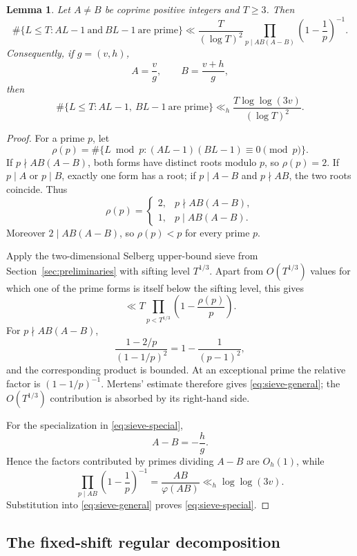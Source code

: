 \documentclass[11pt,reqno]{amsart}
\numberwithin{equation}{section}
\theoremstyle{plain}
\newtheorem{lemma}[theorem]{Lemma}
\theoremstyle{definition}
\theoremstyle{remark}
\begin{document}
\begin{lemma}\label{lem:two-linear-sieve}
Let $A\ne B$ be coprime positive integers and $T\ge3$. Then
\begin{equation}\label{eq:sieve-general}
\#\{L\le T:AL-1\ \text{and}\ BL-1\ \text{are prime}\}
\ll
\frac{T}{(\log T)^2}
\prod_{p\mid AB(A-B)}\left(1-\frac1p\right)^{-1}.
\end{equation}
Consequently, if $g=(v,h)$,
\[
A=\frac vg,\qquad B=\frac{v+h}{g},
\]
then
\begin{equation}\label{eq:sieve-special}
\#\{L\le T:AL-1,\ BL-1\ \text{are prime}\}
\ll_h
\frac{T\log\log(3v)}{(\log T)^2}.
\end{equation}
\end{lemma}
\begin{proof}
For a prime $p$, let
\[
\rho(p)=\#\{L\bmod p:(AL-1)(BL-1)\equiv0\pmod p\}.
\]
If $p\nmid AB(A-B)$, both forms have distinct roots modulo $p$, so $\rho(p)=2$. If $p\mid A$ or $p\mid B$, exactly one form has a root; if $p\mid A-B$ and $p\nmid AB$, the two roots coincide. Thus
\begin{equation}\label{eq:rho}
\rho(p)=
\begin{cases}
2,&p\nmid AB(A-B),\\
1,&p\mid AB(A-B).
\end{cases}
\end{equation}
Moreover $2\mid AB(A-B)$, so $\rho(p)<p$ for every prime $p$.

Apply the two-dimensional Selberg upper-bound sieve from Section~\ref{sec:preliminaries} with sifting level $T^{1/3}$. Apart from $O(T^{1/3})$ values for which one of the prime forms is itself below the sifting level, this gives
\[
\ll T\prod_{p<T^{1/3}}\left(1-\frac{\rho(p)}p\right).
\]
For $p\nmid AB(A-B)$,
\[
\frac{1-2/p}{(1-1/p)^2}=1-\frac1{(p-1)^2},
\]
and the corresponding product is bounded. At an exceptional prime the relative factor is $(1-1/p)^{-1}$. Mertens' estimate therefore gives \eqref{eq:sieve-general}; the $O(T^{1/3})$ contribution is absorbed by its right-hand side.

For the specialization in \eqref{eq:sieve-special},
\[
A-B=-\frac hg.
\]
Hence the factors contributed by primes dividing $A-B$ are $O_h(1)$, while
\[
\prod_{p\mid AB}\left(1-\frac1p\right)^{-1}
=\frac{AB}{\varphi(AB)}
\ll_h\log\log(3v).
\]
Substitution into \eqref{eq:sieve-general} proves \eqref{eq:sieve-special}.
\end{proof}

\subsection{The fixed-shift regular decomposition}
\end{document}
